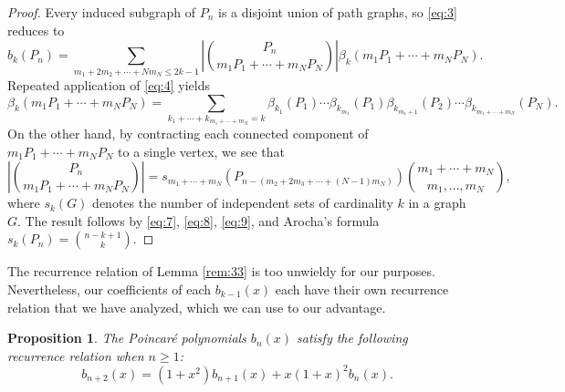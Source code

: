 \documentclass[12pt]{amsart}
\newtheorem{prop}[theorem]{Proposition}
\theoremstyle{definition}
\begin{document}
\begin{proof} 
Every induced subgraph of $P_n$ is a disjoint union of path graphs, so \eqref{eq:3} reduces to
\begin{equation}\label{eq:7}
b_k(P_n)=\sum_{m_1+2m_2+\cdots+Nm_N\le 2k-1} \left|\binom{P_n}{m_1P_1+\cdots+m_NP_N}\right| \beta_k(m_1P_1+\cdots+m_NP_N).
\end{equation}
Repeated application of \eqref{eq:4} yields
\begin{equation}\label{eq:8}
\beta_k(m_1P_1+\cdots+m_NP_N)=\sum_{k_1+\cdots+k_{m_1+\cdots+m_N}=k} \beta_{k_1}(P_1)\cdots\beta_{k_{m_1}}(P_1)\beta_{k_{m_1+1}}(P_2)\cdots \beta_{k_{m_1+\cdots+m_N}}(P_N).
\end{equation}
On the other hand, by contracting each connected component of $m_1P_1+\cdots+m_NP_N$ to a single vertex, we see that 
\begin{equation}\label{eq:9}
\left|\binom{P_n}{m_1P_1+\cdots+m_NP_N}\right| = s_{m_1+\cdots+m_N}(P_{n-(m_2+2m_3+\cdots+(N-1)m_N)})\binom{m_1+\cdots+m_N}{m_1,\ldots,m_N},
\end{equation}
where $s_k(G)$ denotes the number of independent sets of cardinality $k$ in a graph $G$. The result follows by \eqref{eq:7}, \eqref{eq:8}, \eqref{eq:9}, and Arocha's \cite{Arocha84} formula $s_k(P_n)=\binom{n-k+1}{k}$.
\end{proof}

The recurrence relation of Lemma \ref{rem:33} is too unwieldy for our purposes. Nevertheless, our coefficients of each $b_{k-1}(x)$ each have their own recurrence relation that we have analyzed, which we can use to our advantage. 

\begin{prop}\label{totalPoinRecurs}
    The Poincar\'e polynomials $b_n(x)$ satisfy the following recurrence relation when $n \geq 1$:
    \begin{equation}\label{eq:53}
        b_{n+2}(x) = (1+x^2)b_{n+1}(x) + x(1+x)^2 b_n(x).
    \end{equation}
\end{prop}
\end{document}
